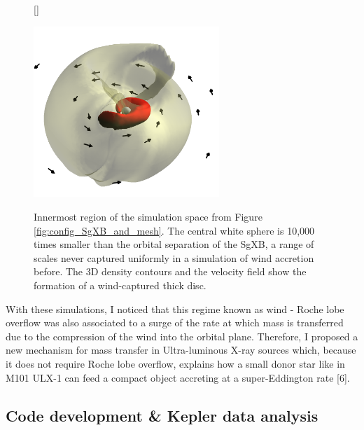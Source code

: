 \documentclass[letterpaper,12pt,onecolumn]{article}
\newcommand{\sgx}{SgXB\xspace}
\begin{document}
\begin{figure}[!h]
\vspace*{-0.3cm}
[\FBwidth]
{\caption{Innermost region of the simulation space from Figure\,\ref{fig:config_SgXB_and_mesh}. The central white sphere is 10,000 times smaller than the orbital separation of the \sgx, a range of scales never captured uniformly in a simulation of wind accretion before. The 3D density contours and the velocity field show the formation of a wind-captured thick disc.}\label{fig:disc}}
{\includegraphics[width=7cm]{Figures/disc.png}}
\vspace*{-0.4cm}
\end{figure}

With these simulations, I noticed that this regime known as wind - Roche lobe overflow was also associated to a surge of the rate at which mass is transferred due to the compression of the wind into the orbital plane. Therefore, I proposed a new mechanism for mass transfer in Ultra-luminous X-ray sources which, because it does not require Roche lobe overflow, explains how a small donor star like in M101 ULX-1 can feed a compact object accreting at a super-Eddington rate [6]. 

\subsection*{Code development \& Kepler data analysis}

\end{document}
